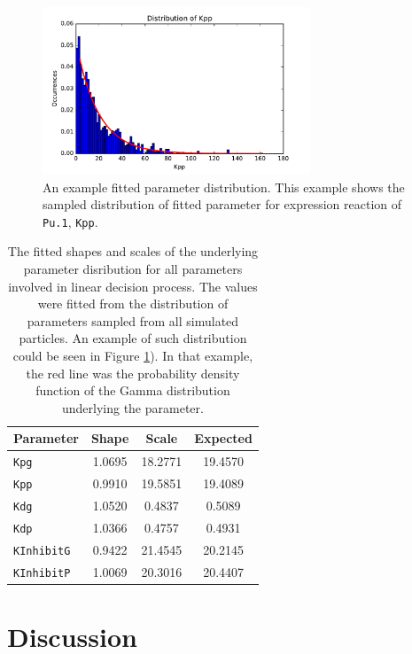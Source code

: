 \documentclass{bioinfo}
\begin{document}
\begin{figure}[h]
\includegraphics[width=8cm]{figures/kpp.pdf}
\caption{An example fitted parameter distribution. This example shows the sampled distribution of fitted parameter for expression reaction of \texttt{Pu.1}, \texttt{Kpp}. }  \label{fig:04}
\end{figure}

\begin{table}[h]
\begin{center}
\begin{tabular}{|l | c | c | c |}
\hline
Parameter & Shape & Scale & Expected \\
\hline
\texttt{Kpg} & 1.0695 & 18.2771 & 19.4570 \\
\texttt{Kpp} & 0.9910 & 19.5851 & 19.4089 \\
\texttt{Kdg} & 1.0520 & 0.4837 & 0.5089 \\
\texttt{Kdp} & 1.0366 & 0.4757 & 0.4931 \\
\texttt{KInhibitG} & 0.9422 & 21.4545 & 20.2145 \\
\texttt{KInhibitP} & 1.0069 & 20.3016 & 20.4407 \\
\hline
\end{tabular}

\vspace*{5pt}

\caption{The fitted shapes and scales of the underlying parameter disribution for all parameters involved in linear decision process. The values were fitted from the distribution of parameters sampled from all simulated particles. An example of such distribution could be seen in Figure \ref{fig:04}). In that example, the red line was the probability density function of the Gamma distribution underlying the parameter.}
\end{center}
\label{tab:01}
\end{table}

\vspace*{-12pt}

\section{Discussion}
\end{document}
